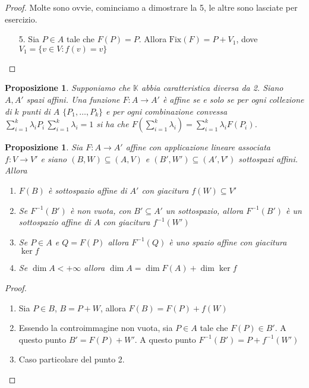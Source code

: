 \documentclass{article}
\newcounter{theo}[section]\setcounter{theo}{0}
\theoremstyle{plain}
\newtheorem{proposition}[theo]{Proposizione}
\theoremstyle{definition}
\theoremstyle{remark}
\begin{document}
\begin{proof} Molte sono ovvie, cominciamo a dimostrare la 5, le altre sono
    lasciate per esercizio. %
\begin{enumerate}[label = \arabic*.]
    \item[5.] Sia \(P \in A\) tale che \(F(P) = P\). Allora \(\text{Fix}(F) =
        P+V_{1}\), dove \(V_{1} = \{v \in V : f(v) = v\} \) 
\end{enumerate}
\end{proof}
\begin{proposition}
    Supponiamo che \(\mathbb{K}\) abbia caratteristica diversa da 2. Siano \(A,
    A'\) spazi affini. Una funzione \(F: A \to A'\) è affine se e solo se per
    ogni collezione di \(k\) punti di \(A\) \(\{P_{1}, \dots, P_k\} \) e per
    ogni combinazione convessa \(\sum_{i=1}^{k} \lambda_i P_i \,\sum_{i=1}^{k}
    \lambda_i = 1 \) si ha che \(F(\sum_{i=1}^{k} \lambda_i ) = \sum_{i=1}^{k}
    \lambda_i F(P_i) \).
\end{proposition}
\begin{proposition}
    Sia \(F: A \to  A'\) affine con applicazione lineare associata \(f: V \to
    V'\) e siano \((B, W) \subseteq (A, V) \) e \((B', W') \subseteq (A', V')
    \) sottospazi affini. Allora
\begin{enumerate}[label = \arabic*.]
    \item \(F(B)\) è sottospazio affine di \(A'\) con giacitura \(f(W) \subseteq
        V'\) 
    \item Se \(F^{-1}(B')\) è non vuota, con \(B' \subseteq A' \) un
        sottospazio, allora \(F^{-1}(B')\) è un sottospazio affine di \(A\) con
        giacitura \(f^{-1}(W')\) 
    \item Se \(P \in A\) e \(Q = F(P)\) allora \(F^{-1}(Q)\) è uno spazio affine
        con giacitura \(\ker f\) 
    \item Se \(\dim A < +\infty\) allora \(\dim A = \dim F(A) + \dim\ker f\) 
\end{enumerate}

\end{proposition}
\begin{proof} \(\)
\begin{enumerate}[label = \arabic*.]
    \item Sia \(P \in B\), \(B = P + W\), allora \(F(B) = F(P) + f(W)\) 
    \item Essendo la controimmagine non vuota, sia \(P\in A\) tale che \(F(P)
        \in B'\). A questo punto \(B' = F(P) + W'\). A questo punto \(F^{-1}(B')
        = P + f^{-1}(W')\) 
    \item Caso particolare del punto 2.
\end{enumerate}
\end{proof}
\end{document}
